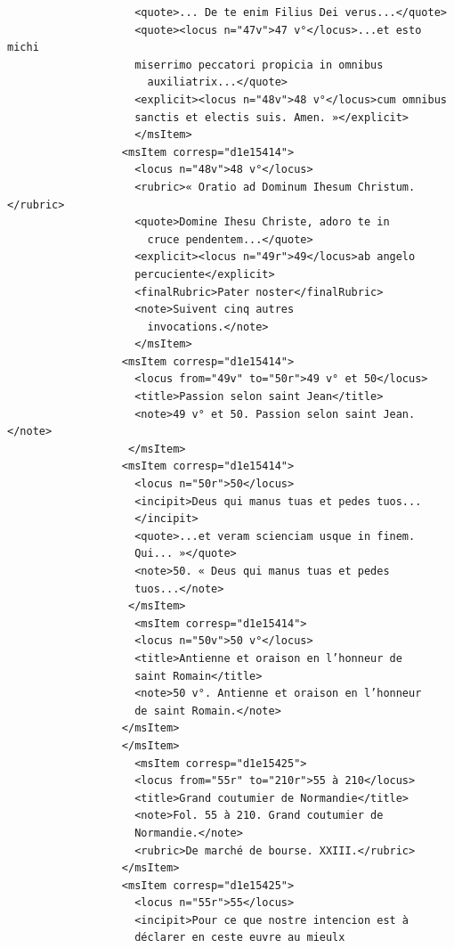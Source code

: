 \documentclass[a4paper,12pt,twoside]{book}
\begin{document}
\begin{verbatim}
                    <quote>... De te enim Filius Dei verus...</quote>
                    <quote><locus n="47v">47 v°</locus>...et esto michi
                    miserrimo peccatori propicia in omnibus
                      auxiliatrix...</quote>
                    <explicit><locus n="48v">48 v°</locus>cum omnibus 
                    sanctis et electis suis. Amen. »</explicit>
                    </msItem>
                  <msItem corresp="d1e15414">
                    <locus n="48v">48 v°</locus>
                    <rubric>« Oratio ad Dominum Ihesum Christum.</rubric>
                    <quote>Domine Ihesu Christe, adoro te in
                      cruce pendentem...</quote>
                    <explicit><locus n="49r">49</locus>ab angelo 
                    percuciente</explicit>
                    <finalRubric>Pater noster</finalRubric>
                    <note>Suivent cinq autres
                      invocations.</note>
                    </msItem>
                  <msItem corresp="d1e15414">
                    <locus from="49v" to="50r">49 v° et 50</locus>
                    <title>Passion selon saint Jean</title>
                    <note>49 v° et 50. Passion selon saint Jean.</note>
                   </msItem>
                  <msItem corresp="d1e15414">
                    <locus n="50r">50</locus>
                    <incipit>Deus qui manus tuas et pedes tuos...
                    </incipit>
                    <quote>...et veram scienciam usque in finem. 
                    Qui... »</quote>
                    <note>50. « Deus qui manus tuas et pedes 
                    tuos...</note>
                   </msItem>
                    <msItem corresp="d1e15414">
                    <locus n="50v">50 v°</locus>
                    <title>Antienne et oraison en l’honneur de
                    saint Romain</title>
                    <note>50 v°. Antienne et oraison en l’honneur 
                    de saint Romain.</note>
                  </msItem>
                  </msItem>
                    <msItem corresp="d1e15425">
                    <locus from="55r" to="210r">55 à 210</locus>
                    <title>Grand coutumier de Normandie</title>
                    <note>Fol. 55 à 210. Grand coutumier de 
                    Normandie.</note>
                    <rubric>De marché de bourse. XXIII.</rubric>
                  </msItem>
                  <msItem corresp="d1e15425">
                    <locus n="55r">55</locus>
                    <incipit>Pour ce que nostre intencion est à 
                    déclarer en ceste euvre au mieulx

\end{verbatim}
\end{document}
